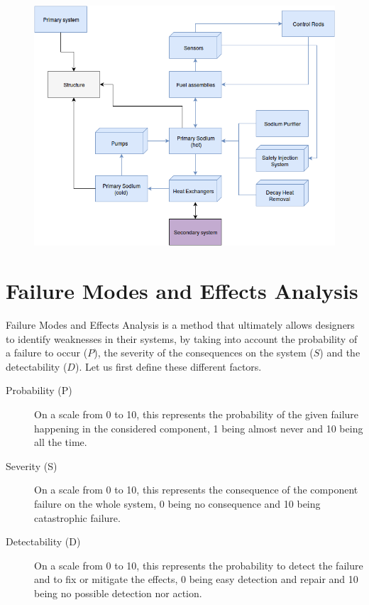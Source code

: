 \begin{figure}[!htb]
	\centering
	\includegraphics[height=0.6\textheight]{fig04/Primary_system}
	\label{fig:rbd_primary_ex}
\end{figure}


\section{Failure Modes and Effects Analysis}
\label{sec:fmea}

Failure Modes and Effects Analysis is a method that ultimately allows designers to identify weaknesses in their systems, by taking into account the probability of a failure to occur ($P$), the severity of the consequences on the system ($S$) and the detectability ($D$). Let us first define these different factors.

\begin{description}

\item[Probability (P)]
On a scale from 0 to 10, this represents the probability of the given failure happening in the considered component, 1 being almost never and 10 being all the time.

\item[Severity (S)]
On a scale from 0 to 10, this represents the consequence of the component failure on the whole system, 0 being no consequence and 10 being catastrophic failure.

\item[Detectability (D)]
On a scale from 0 to 10, this represents the probability to detect the failure and to fix or mitigate the effects, 0 being easy detection and repair and 10 being no possible detection nor action.

\end{description}

